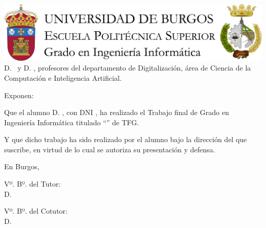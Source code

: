 \documentclass[a4paper,12pt,twoside]{memoir}
\begin{document}
\portada

\newpage\null\thispagestyle{empty}

\newpage\thispagestyle{empty}
\noindent\includegraphics[width=\textwidth]{../assets/cabecera}\vspace{1cm}
\noindent D. \tutor\ y D. \cotutor, profesores del departamento de Digitalización, área de Ciencia de la Computación e Inteligencia Artificial.

\noindent Exponen:

\noindent Que el alumno D. \autor, con DNI \dni, ha realizado el Trabajo final de Grado en Ingeniería Informática titulado ``\titulo'' \space de TFG. 

\noindent Y que dicho trabajo ha sido realizado por el alumno bajo la dirección del que suscribe, en virtud de lo cual se autoriza su presentación y defensa.
\begin{center}
    En Burgos, {\large \fecha}
\end{center}
\vfill\vfill\vfill
\begin{minipage}{0.45\textwidth}
\begin{flushleft}
    Vº. Bº. del Tutor:\\[2cm]
    D. \tutor
\end{flushleft}
\end{minipage}
\hfill
\begin{minipage}{0.45\textwidth}
\begin{flushleft}
    Vº. Bº. del Cotutor:\\[2cm]
    D. \cotutor
\end{flushleft}
\end{minipage}
\hfill
\vfill

\newpage\null\thispagestyle{empty}
\end{document}
